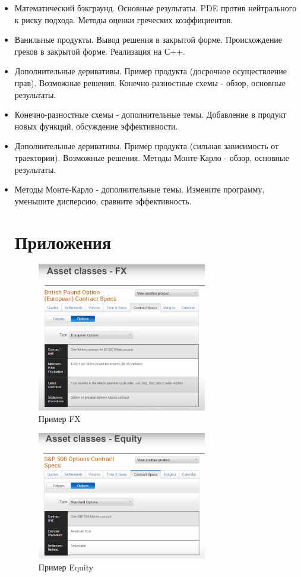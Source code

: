 \documentclass{article}
\begin{document}
\begin{itemize}
 
  \item Математический бэкграунд. Основные результаты. PDE против нейтрального к риску подхода. Методы оценки греческих коэффициентов.
  \item Ванильные продукты. Вывод решения в закрытой форме. Происхождение греков в закрытой форме. Реализация на С++.
  \item Дополнительные деривативы. Пример продукта (досрочное осуществление прав). Возможные решения. Конечно-разностные схемы - обзор, основные результаты.
  \item Конечно-разностные схемы - дополнительные темы. Добавление в продукт новых функций, обсуждение эффективности.
  \item Дополнительные деривативы. Пример продукта (сильная зависимость от траектории). Возможные решения. Методы Монте-Карло - обзор, основные результаты.
  \item Методы Монте-Карло - дополнительные темы. Измените программу, уменьшите дисперсию, сравните эффективность.

\section{Приложения}

\begin{figure}[h]
\centering
\includegraphics[width=0.7\textwidth]{1.png}
\caption{Пример FX}
\label{loadings}
\end{figure}

\begin{figure}[h]
\centering
\includegraphics[width=0.7\textwidth]{2.png}
\caption{Пример Equity}
\label{loadings}
\end{figure}


\end{itemize}
\end{document}
